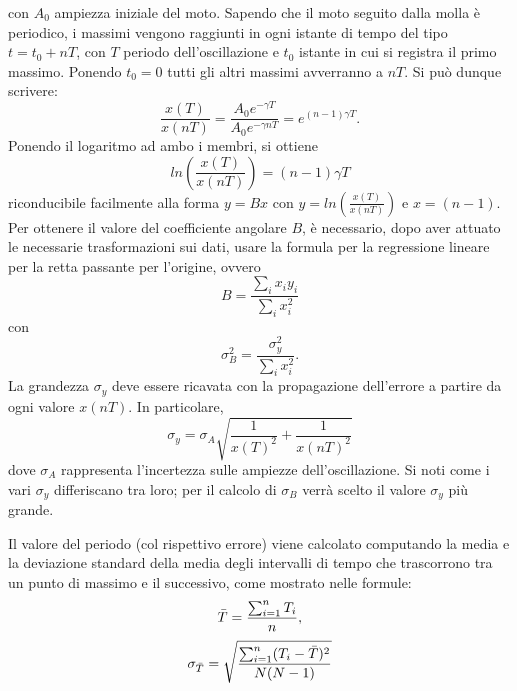 \documentclass{article}
\begin{document}
con $A_0$ ampiezza iniziale del moto.
Sapendo che il moto seguito dalla molla è periodico, i massimi vengono raggiunti in ogni istante di tempo del tipo $t=t_0+nT$, con $T$ periodo dell'oscillazione e $t_0$ istante in cui si registra il primo massimo. Ponendo $t_0=0$  tutti gli altri massimi avverranno a $nT$. Si può dunque scrivere:
\begin{equation}
    \frac{x(T)}{x(nT)}=\frac{A_0e^{-\gamma T}}{A_0e^{-\gamma nT}}=e^{(n-1)\gamma T}.
\end{equation}
Ponendo il logaritmo ad ambo i membri, si ottiene
\begin{equation}
    ln( \frac{x(T)}{x(nT)})=(n-1)\gamma T
\end{equation}
riconducibile facilmente alla forma $y=Bx$ con $y=ln( \frac{x(T)}{x(nT)})$ e $x=(n-1)$.
Per ottenere il valore del coefficiente angolare $B$, è necessario, dopo aver attuato le necessarie trasformazioni sui dati, usare la formula per la regressione lineare per la retta passante per l'origine, ovvero
\begin{equation}
    B=\frac{\sum_{i}x_iy_i}{\sum_{i}x_i^2}
\end{equation}
con 
\begin{equation}
    \sigma_B^2=\frac{\sigma_y^2}{\sum_{i}x_i^2}.
\end{equation}
La grandezza $\sigma_y$ deve essere ricavata con la propagazione dell'errore a partire da ogni valore $x(nT)$. In particolare,
\begin{equation}
    \sigma_y=\sigma_A \sqrt{\frac{1}{x(T)^2}+\frac{1}{x(nT)^2}}
\end{equation}
dove $\sigma_A$ rappresenta l'incertezza sulle ampiezze dell'oscillazione.
Si noti come i vari $\sigma_y$ differiscano tra loro; per il calcolo di $\sigma_B$ verrà scelto il valore $\sigma_y$ più grande.

Il valore del periodo (col rispettivo errore) viene calcolato computando la media e la deviazione standard della media degli intervalli di tempo che trascorrono tra un punto di massimo e il successivo, come mostrato nelle formule:
\begin{equation}
     \Bar{T}=\frac{\sum_{i=1}^{n} T_i}{n},
\end{equation}
\begin{equation}
    \sigma_{\Bar{T}}=\sqrt{\frac{\sum_{i=1}^{n} (T_i-\Bar{T})^2}{N(N-1)}}
\end{equation}
\end{document}
